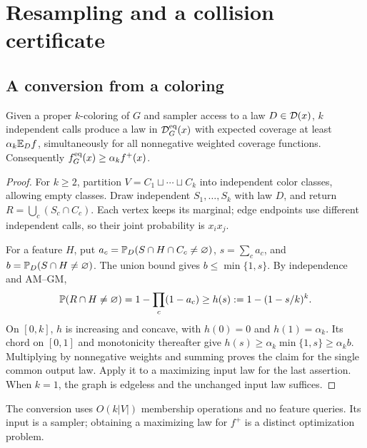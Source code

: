 \section{Resampling and a collision certificate}\label{sec:proof}
\subsection{A conversion from a coloring}\label{sec:color}

\begin{lemma}\label{lem:color}
Given a proper \(k\)-coloring of \(G\) and sampler access to a law
\(D\in\mathcal D(x)\), \(k\) independent calls produce a law in
\(\mathcal D_G^{\mathrm{eq}}(x)\) with expected coverage at least \(\alpha_k\mathbb E_D f\),
simultaneously for all nonnegative weighted coverage functions. Consequently
\(f_G^{\mathrm{eq}}(x)\geq\alpha_k f^+(x)\).
\end{lemma}
\begin{proof}
For \(k\geq2\), partition \(V=C_1\sqcup\cdots\sqcup C_k\) into
independent color classes, allowing empty classes. Draw independent
\(S_1,\ldots,S_k\) with law \(D\), and return
\(R=\bigcup_c(S_c\cap C_c)\). Each vertex keeps its marginal; edge endpoints
use different independent calls, so their joint probability is \(x_ix_j\).

For a feature \(H\), put \(a_c=\mathbb P_D(S\cap H\cap C_c\ne\varnothing)\),
\(s=\sum_c a_c\), and \(b=\mathbb P_D(S\cap H\ne\varnothing)\).
The union bound gives \(b\leq\min\{1,s\}\). By independence and AM--GM,
\[
 \mathbb P(R\cap H\ne\varnothing)
 =1-\prod_c(1-a_c)\geq h(s):=1-(1-s/k)^k.
\]
On \([0,k]\), \(h\) is increasing and concave, with \(h(0)=0\) and
\(h(1)=\alpha_k\). Its chord on \([0,1]\) and monotonicity thereafter give
\(h(s)\geq\alpha_k\min\{1,s\}\geq\alpha_k b\).
Multiplying by nonnegative weights and summing proves the claim for the
single common output law. Apply it to a maximizing input law for the last
assertion. When \(k=1\), the graph is edgeless and the unchanged input law
suffices.
\end{proof}

The conversion uses \(O(k|V|)\) membership operations and no feature
queries. Its input is a sampler; obtaining a maximizing law for \(f^+\)
is a distinct optimization problem.

